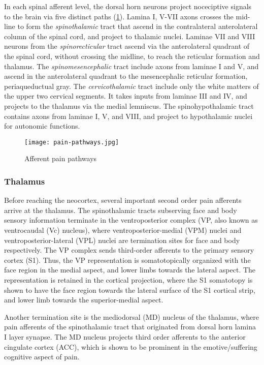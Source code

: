 In each spinal afferent level, the dorsal horn neurons project noceciptive signals to the brain via five distinct paths (\ref{fig:pain-pathways}). Lamina I, V-VII axons crosses the mid-line to form the \textit{spinothalamic} tract that ascend in the contralateral anterolateral column of the spinal cord, and project to thalamic nuclei. Laminae VII and VIII neurons from the \textit{spinorecticular} tract ascend via the anterolateral quadrant of the spinal cord, without crossing the midline, to reach the reticular formation and thalamus. The \textit{spinomesencephalic} tract include axons from laminae I and V, and ascend in the anterolateral quadrant to the mesencephalic reticular formation, periaqueductual gray. The \textit{cervicothalamic} tract include only the white matters of the upper two cervical segments. It takes inputs from laminae III and IV, and projects to the thalamus via the medial lemniscus. The spinohypothalamic tract contains axons from laminae I, V, and VIII, and project to hypothalamic nuclei for autonomic functions. 

 \begin{figure}[ht]
 \texttt{[image: pain-pathways.jpg]}
 \centering
 \caption{Afferent pain pathways \protect\cite{kandel2000principles}}
 \label{fig:pain-pathways}
 \end{figure}
 
 
\subsubsection{Thalamus}

Before reaching the neocortex, several important second order pain afferents arrive at the thalamus. The spinothalamic tracts subserving face and body sensory information terminate in the ventroposterior complex (VP, also known as ventrocaudal (Vc) nucleus), where ventroposterior-medial (VPM) nuclei and ventroposterior-lateral (VPL) nuclei are termination sites for face and body respectively. The VP complex sends third-order afferents to the primary sensory cortex (S1). Thus, the VP representation is somatotopically organized with the face region in the medial aspect, and lower limbs towards the lateral aspect. The representation is retained in the cortical projection, where the S1 somatotopy is shown to have the face region towards the lateral surface of the S1 cortical strip, and lower limb towards the superior-medial aspect. 

Another termination site is the mediodorsal (MD) nucleus of the thalamus, where pain afferents of the spinothalamic tract that originated from dorsal horn lamina I layer synapse. The MD nucleus projects third order afferents to the anterior cingulate cortex (ACC), which is shown to be prominent in the emotive/suffering cognitive aspect of pain.  


